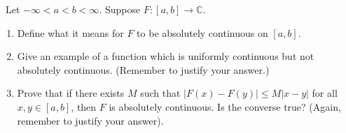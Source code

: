 \documentclass[12pt]{Homework}
\begin{document}
\begin{problem} $\,$
Let $-\infty<a<b<\infty$. Suppose $F:[a,b]\to\mathbb{C}$. 
\begin{enumerate}[label=(\alph*)]
    \item Define what it means for $F$ to be absolutely continuous on $[a,b]$.
    \item Give an example of a function which is uniformly continuous but not absolutely continuous. (Remember to justify your answer.)
    \item Prove that if there exists $M$ such that $|F(x)-F(y)|\le M|x-y|$ for all $x,y\in[a,b]$, then $F$ is absolutely continuous. Is the converse true? (Again, remember to justify your answer).
\end{enumerate}
\end{problem}
\end{document}
